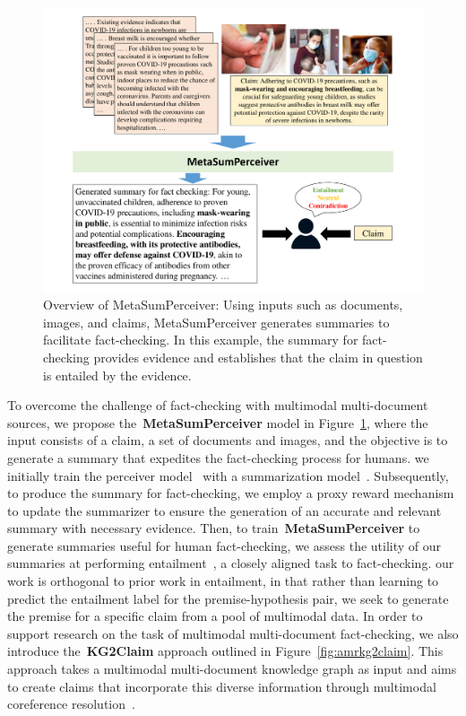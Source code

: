 \begin{figure}
\centering\includegraphics[width=\textwidth,height=0.5\textwidth,keepaspectratio]{images/metasumperceiver.pdf}
  \caption{Overview of MetaSumPerceiver: Using inputs such as documents, images, and claims, MetaSumPerceiver generates summaries to facilitate fact-checking. In this example, the summary for fact-checking provides evidence and establishes that the claim in question is entailed by the evidence.}
  \label{fig:metasumperceiver_overview}
\end{figure}

To overcome the challenge of fact-checking with multimodal multi-document sources, we propose the~\textbf{MetaSumPerceiver} model in Figure~\ref{fig:metasumperceiver_overview}, where the input consists of a claim, a set of documents and images, and the objective is to generate a summary that expedites the fact-checking process for humans. we initially train the perceiver model~\cite{jaegle2022perceiver,jaegle2022perceiver_1} with a summarization model~\cite{lewis2019bart}. Subsequently, to produce the summary for fact-checking, we employ a proxy reward mechanism to update the summarizer to ensure the generation of an accurate and relevant summary with necessary evidence. Then, to train~\textbf{MetaSumPerceiver} to generate summaries useful for human fact-checking, we assess the utility of our summaries at performing entailment~\cite{inproceedings, poliak2020survey, bowman-etal-2015-large}, a closely aligned task to fact-checking. our work is orthogonal to prior work in entailment, in that rather than learning to predict the entailment label for the premise-hypothesis pair, we seek to generate the premise for a specific claim from a pool of multimodal data. In order to support research on the task of multimodal multi-document fact-checking, we also introduce the~\textbf{KG2Claim} approach outlined in Figure~\ref{fig:amrkg2claim}. This approach takes a multimodal multi-document knowledge graph as input and aims to create claims that incorporate this diverse information through multimodal coreference resolution~\cite{otmazgin2022fcoref, cattan2021realistic, caciularu-etal-2021-cdlm-cross}. 

